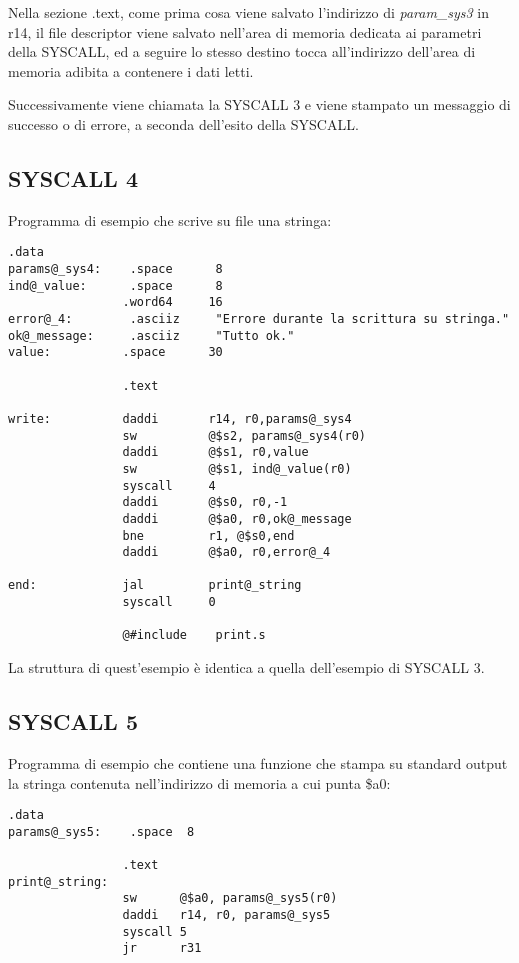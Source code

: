 \documentclass[letterpaper,10pt,english]{sphinxmanual}
\begin{document}
Nella sezione .text, come prima cosa viene salvato l'indirizzo di \emph{param\_sys3}
in r14, il file descriptor viene salvato nell'area di memoria dedicata ai
parametri della SYSCALL, ed a seguire lo stesso destino tocca all'indirizzo
dell'area di memoria adibita a contenere i dati letti.

Successivamente viene chiamata la SYSCALL 3 e viene stampato un messaggio di
successo o di errore, a seconda dell'esito della SYSCALL.


\subsection{SYSCALL 4}
\label{examples:syscall-4}
Programma di esempio che scrive su file una stringa:

\begin{Verbatim}[commandchars=@\[\]]
                .data
params@_sys4:    .space      8
ind@_value:      .space      8
                .word64     16
error@_4:        .asciiz     "Errore durante la scrittura su stringa."
ok@_message:     .asciiz     "Tutto ok."
value:          .space      30

                .text

write:          daddi       r14, r0,params@_sys4
                sw          @$s2, params@_sys4(r0)
                daddi       @$s1, r0,value
                sw          @$s1, ind@_value(r0)
                syscall     4
                daddi       @$s0, r0,-1
                daddi       @$a0, r0,ok@_message
                bne         r1, @$s0,end
                daddi       @$a0, r0,error@_4

end:            jal         print@_string
                syscall     0

                @#include    print.s
\end{Verbatim}

La struttura di quest'esempio è identica a quella dell'esempio di SYSCALL 3.


\subsection{SYSCALL 5}
\label{examples:syscall-5}
Programma di esempio che contiene una funzione che stampa su standard output la
stringa contenuta nell'indirizzo di memoria a cui punta \$a0:

\begin{Verbatim}[commandchars=@\[\]]
                .data
params@_sys5:    .space  8

                .text
print@_string:
                sw      @$a0, params@_sys5(r0)
                daddi   r14, r0, params@_sys5
                syscall 5
                jr      r31
\end{Verbatim}
\end{document}
